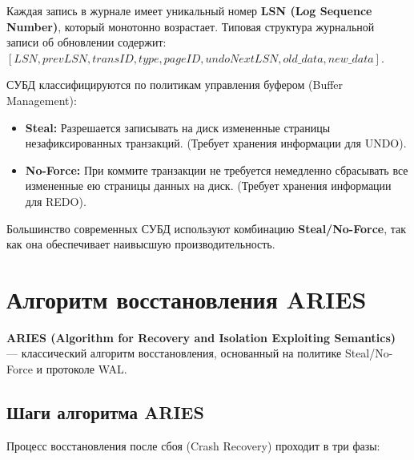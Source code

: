 \documentclass[a4paper,12pt]{article}
\begin{document}
Каждая запись в журнале имеет уникальный номер \textbf{LSN (Log Sequence Number)}, который монотонно возрастает.
Типовая структура журнальной записи об обновлении содержит:
$[LSN, prevLSN, transID, type, pageID, undoNextLSN, old\_data, new\_data]$.

СУБД классифицируются по политикам управления буфером (Buffer Management):
\begin{itemize}
    \item \textbf{Steal:} Разрешается записывать на диск измененные страницы незафиксированных транзакций. (Требует хранения информации для UNDO).
    \item \textbf{No-Force:} При коммите транзакции не требуется немедленно сбрасывать все измененные ею страницы данных на диск. (Требует хранения информации для REDO).
\end{itemize}
Большинство современных СУБД используют комбинацию \textbf{Steal/No-Force}, так как она обеспечивает наивысшую производительность.

\section{Алгоритм восстановления ARIES}

\textbf{ARIES (Algorithm for Recovery and Isolation Exploiting Semantics)} — классический алгоритм восстановления, основанный на политике Steal/No-Force и протоколе WAL.

\subsection{Шаги алгоритма ARIES}
Процесс восстановления после сбоя (Crash Recovery) проходит в три фазы:
\end{document}
